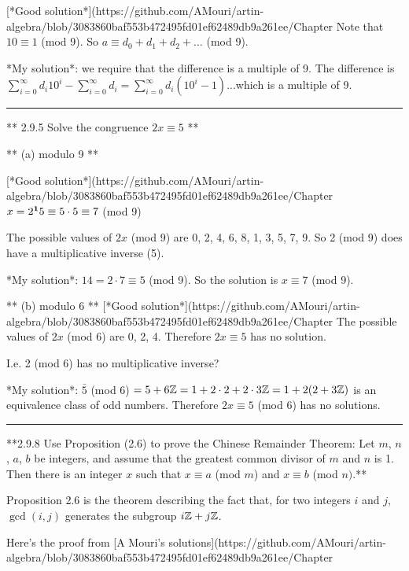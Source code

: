 [*Good solution*](https://github.com/AMouri/artin-algebra/blob/3083860baf553b472495fd01ef62489db9a261ee/Chapter%
Note that $10 \equiv 1$ (mod 9). So $a \equiv d_0 + d_1 + d_2 + \ldots$ (mod 9).

*My solution*: we require that the difference is a multiple of 9. The difference
is $\sum_{i=0}^\infty d_i 10^i - \sum_{i=0}^\infty d_i = \sum_{i=0}^\infty
d_i(10^i - 1)$...which is a multiple of 9.


\hrule

** 2.9.5 Solve the congruence $2x \equiv 5$ **

** (a) modulo 9 **

[*Good solution*](https://github.com/AMouri/artin-algebra/blob/3083860baf553b472495fd01ef62489db9a261ee/Chapter%
$x = 2^{\mathbf 1} 5 \equiv 5 \cdot 5 \equiv 7$ (mod 9)

The possible values of $2x$ (mod 9) are 0, 2, 4, 6, 8, 1, 3, 5, 7, 9. So 2 (mod
9) does have a multiplicative inverse (5).


*My solution*: $14 = 2 \cdot 7 \equiv 5$ (mod 9). So the solution is $x \equiv 7$ (mod 9).

** (b) modulo 6 **
[*Good solution*](https://github.com/AMouri/artin-algebra/blob/3083860baf553b472495fd01ef62489db9a261ee/Chapter%
The possible values of $2x$ (mod 6) are 0, 2, 4. Therefore $2x \equiv 5$ has no
solution.

I.e. 2 (mod 6) has no multiplicative inverse?

*My solution*: $\bar 5$ (mod 6) $= 5 + 6\mathbb{Z} = 1 + 2\cdot2 + 2\cdot3\mathbb{Z} = 1 + 2(2 + 3\mathbb{Z})$ is an
equivalence class of odd numbers. Therefore $2x \equiv 5$ (mod 6) has no
solutions.



\hrule

**2.9.8 Use Proposition (2.6) to prove the Chinese Remainder Theorem: Let $m$,
$n$, $a$, $b$ be integers, and assume that the greatest common divisor of $m$
and $n$ is 1. Then there is an integer $x$ such that $x \equiv a$ (mod $m$)
and $x \equiv b$ (mod $n)$.**

Proposition 2.6 is the theorem describing the fact that, for two integers $i$
and $j$, $\gcd(i, j)$ generates the subgroup $i\mathbb{Z} + j\mathbb{Z}$.

Here's the proof from [A Mouri's solutions](https://github.com/AMouri/artin-algebra/blob/3083860baf553b472495fd01ef62489db9a261ee/Chapter%

